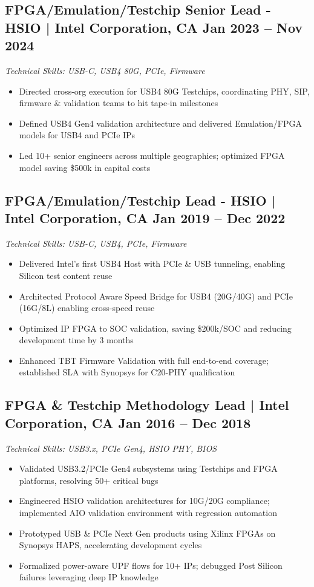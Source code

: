 \documentclass[10pt,letterpaper]{article}
\newcommand{\jobheader}[4]{%
  \subsection*{\textbf{#1} | #2  \hfill #4}
  \vspace{-1pt}
  {\small\textit{Technical Skills: #3}}
  \vspace{0pt}
}
\begin{document}
\jobheader{FPGA/Emulation/Testchip Senior Lead - HSIO}{Intel Corporation, CA}{USB-C, USB4 80G, PCIe, Firmware}{Jan 2023 -- Nov 2024}

\begin{itemize}
\item Directed cross-org execution for USB4 80G Testchips, coordinating PHY, SIP, firmware \& validation teams to hit tape-in milestones
\item Defined USB4 Gen4 validation architecture and delivered Emulation/FPGA models for USB4 and PCIe IPs
\item Led 10+ senior engineers across multiple geographies; optimized FPGA model saving \$500k in capital costs
\end{itemize}

\jobheader{FPGA/Emulation/Testchip Lead - HSIO}{Intel Corporation, CA}{USB-C, USB4, PCIe, Firmware}{Jan 2019 -- Dec 2022}

\begin{itemize}
\item Delivered Intel's first USB4 Host with PCIe \& USB tunneling, enabling Silicon test content reuse
\item Architected Protocol Aware Speed Bridge for USB4 (20G/40G) and PCIe (16G/8L) enabling cross-speed reuse
\item Optimized IP FPGA to SOC validation, saving \$200k/SOC and reducing development time by 3 months
\item Enhanced TBT Firmware Validation with full end-to-end coverage; established SLA with Synopsys for C20-PHY qualification
\end{itemize}

\jobheader{FPGA \& Testchip Methodology Lead}{Intel Corporation, CA}{USB3.x, PCIe Gen4, HSIO PHY, BIOS}{Jan 2016 -- Dec 2018}

\begin{itemize}
\item Validated USB3.2/PCIe Gen4 subsystems using Testchips and FPGA platforms, resolving 50+ critical bugs
\item Engineered HSIO validation architectures for 10G/20G compliance; implemented AIO validation environment with regression automation
\item Prototyped USB \& PCIe Next Gen products using Xilinx FPGAs on Synopsys HAPS, accelerating development cycles
\item Formalized power-aware UPF flows for 10+ IPs; debugged Post Silicon failures leveraging deep IP knowledge
\end{itemize}
\end{document}

